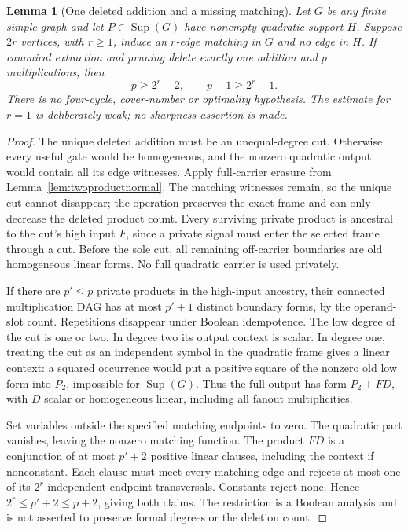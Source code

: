 \documentclass[11pt]{article}
\newcommand{\Sup}{\operatorname{Sup}}
\newtheorem{lemma}[theorem]{Lemma}
\theoremstyle{definition}
\theoremstyle{remark}
\begin{document}
\begin{lemma}[One deleted addition and a missing matching]\label{lem:oneadditionmatching}
Let $G$ be any finite simple graph and let $P\in\Sup(G)$ have nonempty quadratic support $H$. Suppose $2r$ vertices, with $r\ge1$, induce an $r$-edge matching in $G$ and no edge in $H$. If canonical extraction and pruning delete exactly one addition and $p$ multiplications, then
\[
 p\ge 2^r-2,\qquad p+1\ge2^r-1.
\]
There is no four-cycle, cover-number or optimality hypothesis. The estimate for $r=1$ is deliberately weak; no sharpness assertion is made.
\end{lemma}
\begin{proof}
The unique deleted addition must be an unequal-degree cut. Otherwise every useful gate would be homogeneous, and the nonzero quadratic output would contain all its edge witnesses. Apply full-carrier erasure from Lemma~\ref{lem:twoproductnormal}. The matching witnesses remain, so the unique cut cannot disappear; the operation preserves the exact frame and can only decrease the deleted product count. Every surviving private product is ancestral to the cut's high input $F$, since a private signal must enter the selected frame through a cut. Before the sole cut, all remaining off-carrier boundaries are old homogeneous linear forms. No full quadratic carrier is used privately.

If there are $p'\le p$ private products in the high-input ancestry, their connected multiplication DAG has at most $p'+1$ distinct boundary forms, by the operand-slot count. Repetitions disappear under Boolean idempotence. The low degree of the cut is one or two. In degree two its output context is scalar. In degree one, treating the cut as an independent symbol in the quadratic frame gives a linear context: a squared occurrence would put a positive square of the nonzero old low form into $P_2$, impossible for $\Sup(G)$. Thus the full output has form $P_2+FD$, with $D$ scalar or homogeneous linear, including all fanout multiplicities.

Set variables outside the specified matching endpoints to zero. The quadratic part vanishes, leaving the nonzero matching function. The product $FD$ is a conjunction of at most $p'+2$ positive linear clauses, including the context if nonconstant. Each clause must meet every matching edge and rejects at most one of its $2^r$ independent endpoint transversals. Constants reject none. Hence $2^r\le p'+2\le p+2$, giving both claims. The restriction is a Boolean analysis and is not asserted to preserve formal degrees or the deletion count.
\end{proof}
\end{document}

